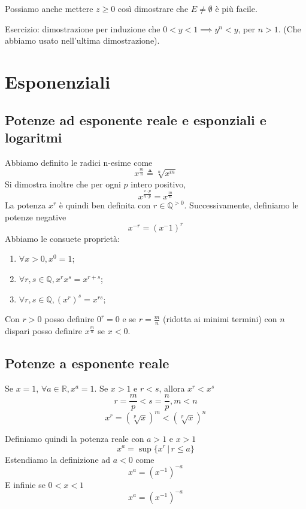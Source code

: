 \documentclass[a4paper]{article}
\begin{document}
Possiamo anche mettere \(z\geq 0\) così dimostrare che \(E\neq \emptyset\) è più facile.

Esercizio: dimostrazione per induzione che \(0<y<1 \implies y^n < y\), per \(n > 1\).
(Che abbiamo usato nell'ultima dimostrazione).

\pagebreak

\section{Esponenziali}

\subsection{Potenze ad esponente reale e esponziali e logaritmi}

Abbiamo definito le radici n-esime come
\[
    x^\frac{m}{n} \triangleq \sqrt[n]{x^m}
\]
Si dimostra inoltre che per ogni \(p\) intero positivo,
\[
    x^{\frac{x\cdot p}{n\cdot p}} = x^\frac{m}{n}
\]
La potenza \(x^r\) è quindi ben definita con \(r\in\mathbb{Q}^{> 0}\).
Successivamente, definiamo le potenze negative
\[
    x^{-r} = {(x^-1)}^r
\]
Abbiamo le consuete proprietà:
\begin{enumerate}
    \item \(\forall x>0, x^0 = 1\);
    \item \(\forall r,s\in\mathbb{Q}, x^rx^s = x^{r+s}\);
    \item \(\forall r,s\in\mathbb{Q}, {(x^r)}^s = x^{rs}\);
\end{enumerate}

Con \(r>0\) posso definire \(0^r = 0\)
e se \(r=\frac{m}{n}\) (ridotta ai minimi termini) con \(n\) dispari
posso definire \(x^\frac{m}{n}\) se \(x<0\).

\subsection{Potenze a esponente reale}

Se \(x=1\), \(\forall a\in \mathbb{R}, x^a = 1\).
Se \(x>1\) e \(r<s\), allora \(x^r < x^s\)
\[
    r = \frac{m}{p} < s = \frac{n}{p}, m < n
\]
\[
    x^r = {(\sqrt[p]{x})}^m < {(\sqrt[p]{x})}^n
\]

Definiamo quindi la potenza reale con \(a>1\) e \(x>1\)
\[
    x^a = \sup \{ x^r \,|\, r \leq a \}
\]
Estendiamo la definizione ad \(a < 0\) come
\[
    x^a = {(x^{-1})}^{-a}
\]
E infinie se \(0<x<1\)
\[
    x^a = {(x^{-1})}^{-a}
\]
\end{document}
